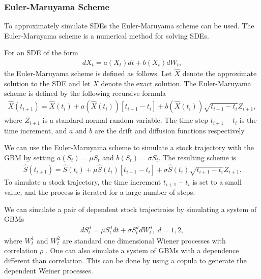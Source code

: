 \subsubsection{Euler-Maruyama Scheme}
To approximately simulate \gls{SDE}s the Euler-Maruyama scheme can be used. The Euler-Maruyama scheme is a numerical method for solving \gls{SDE}s. 

For an \gls{SDE} of the form
\begin{align*}
    dX_t = a(X_t)dt + b(X_t)dW_t,
\end{align*}
the Euler-Maruyama scheme is defined as follows. 
Let $\hat{X}$ denote the approximate solution to the \gls{SDE} and let $X$ denote the exact solution. The Euler-Maruyama scheme is defined by the following recursive formula 
\begin{align*}
    \hat{X}(t_{i+1}) = \hat{X}(t_i) + a(\hat{X}(t_i))[t_{i+1}-t_i]  + b(\hat{X}(t_i)) \sqrt{t_{i+1}-t_i} Z_{i+1},
\end{align*}
where $Z_{i+1}$ is a standard normal random variable. The time step $t_{i+1}-t_i$ is the time increment, and $a$ and $b$ are the drift and diffusion functions respectively .

We can use the Euler-Maruyama scheme to simulate a stock trajectory with the \gls{GBM} by setting $a(S_t) = \mu S_t$ and $b(S_t) = \sigma S_t$. The resulting scheme is
\begin{align*}
    \hat{S}(t_{i+1}) = \hat{S}(t_i) + \mu \hat{S}(t_i)[t_{i+1}-t_i]  + \sigma \hat{S}(t_i) \sqrt{t_{i+1}-t_i} Z_{i+1}.
\end{align*}
To simulate a stock trajectory, the time increment $t_{i+1}-t_i$ is set to a small value, and the process is iterated for a large number of steps. 

We can simulate a pair of dependent stock trajectroies by simulating a system of \gls{GBM}s  
\begin{align*}
    dS_t^d = \mu S_t^d dt + \sigma S_t^d dW_t^d, \; d=1,2, 
\end{align*}
where $W_t^1$ and $W_t^2$ are standard one dimensional Wiener processes with correlation $\rho$ . One can also simulate a system of \gls{GBM}s with a dependence different than correlation. This can be done by using a copula to generate the dependent Weiner processes. 




